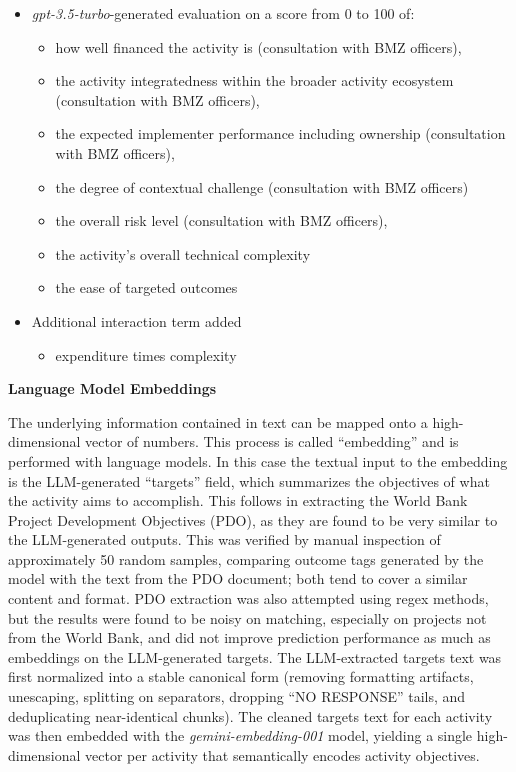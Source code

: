 \begin{itemize}
 \item \emph{gpt-3.5-turbo}-generated evaluation on a score from 0 to 100 of:
 \begin{itemize}[noitemsep,topsep=0pt]
 \item  how well financed the activity is (consultation with BMZ officers), \citep{bulmanGoodCountriesGood2017} \citep{goldembergMindingGapAid2025} \citep{eilersVolumeRiskComplexitya}
 \item  the activity integratedness within the broader activity ecosystem (consultation with BMZ officers), \citep{vivaltHowMuchCan2020}
 \item  the expected implementer performance including ownership (consultation with BMZ officers), \citep{bulmanGoodCountriesGood2017} \citep{goldembergMindingGapAid2025} \citep{ashtonPuzzleMissingPieces2021}
 \item  the degree of contextual challenge (consultation with BMZ officers)
 \item  the overall risk level (consultation with BMZ officers), \citep{eilersVolumeRiskComplexitya}
 \item  the activity's overall technical complexity \citep{eilersVolumeRiskComplexitya}
 \item  the ease of targeted outcomes
\end{itemize}
\item Additional interaction term added
\begin{itemize}
\item expenditure times complexity
\end{itemize}
\end{itemize}

\textbf{Language Model Embeddings}

The underlying information contained in text can be mapped onto a high-dimensional vector of numbers. This process is called ``embedding'' and is performed with language models. In this case the textual input to the embedding is the LLM-generated ``targets'' field, which summarizes the objectives of what the activity aims to accomplish. This follows \citep{goldembergMindingGapAid2025} in extracting the World Bank Project Development Objectives (PDO), as they are found to be very similar to the LLM-generated outputs. This was verified by manual inspection of approximately 50 random samples, comparing outcome tags generated by the model with the text from the PDO document; both tend to cover a similar content and format. PDO extraction was also attempted using regex methods, but the results were found to be noisy on matching, especially on projects not from the World Bank, and did not improve prediction performance as much as embeddings on the LLM-generated targets. The LLM-extracted targets text was first normalized into a stable canonical form (removing formatting artifacts, unescaping, splitting on separators, dropping “NO RESPONSE” tails, and deduplicating near-identical chunks). The cleaned targets text for each activity was then embedded with the \emph{gemini-embedding-001} model, yielding a single high-dimensional vector per activity that semantically encodes activity objectives.

